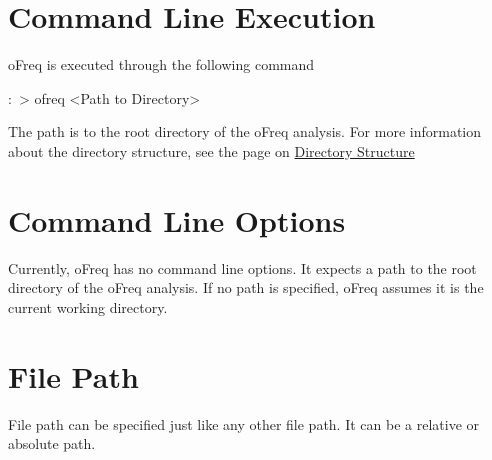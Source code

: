 \section*{Command Line Execution}

o\-Freq is executed through the following command \begin{DoxyVerb}:~> ofreq <Path to Directory>
\end{DoxyVerb}


The path is to the root directory of the o\-Freq analysis. For more information about the directory structure, see the page on \hyperlink{directory_structure}{Directory Structure}

\section*{Command Line Options}

Currently, o\-Freq has no command line options. It expects a path to the root directory of the o\-Freq analysis. If no path is specified, o\-Freq assumes it is the current working directory.

\section*{File Path}

File path can be specified just like any other file path. It can be a relative or absolute path. 